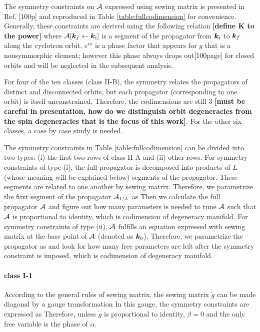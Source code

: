 \documentclass[aps, prb, showpacs, twocolumn, notitlepage, superscriptaddress]{revtex4-1}
\begin{document}
The symmetry constraints on ${\cal A}$ expressed using sewing matrix is presented in Ref. [100p] and reproduced in Table \ref{table:fullcodimension} for convenience. Generally, these constraints are derived using the following relation
\textbf{[define K to the power]} where ${\cal A}[\boldsymbol{k}_f\leftarrow \boldsymbol{k}_i]$ is a segment of the propagator from $\boldsymbol{k}_i$ to $\boldsymbol{k}_f$ along the cyclotron orbit. $e^{i\phi}$ is a phase factor that appears for $g$ that is a nonsymmorphic element; however this phase always drops out[100page] for closed orbits and will be neglected in the subsequent analysis.

For four of  the ten classes (class II-B), the symmetry relates the propagators of distinct and disconnected orbits, but each propagator (corresponding to one orbit) is itself unconstrained.  Therefore, the codimensions are still 3 \textbf{[must be careful in presentation, how do we distinguish orbit degeneracies from the spin degeneracies that is the focus of this work]}. For the other six classes, a case by case study is needed. 

The symmetry constraints in Table \ref{table:fullcodimension} can be divided into two types: (i) the first two rows of class II-A and (ii) other rows. For symmetry constraints of type (i), the full propagator is decomposed into products of $L$ (whose meaning will be explained below) segments of the propagator. These segments are related to one another by sewing matrix. Therefore, we parametrize the first segment of the propagator ${\cal A}_{1/L}$ as
Then we calculate the full propagator ${\cal A}$ and figure out how many parameters is needed to tune ${\cal A}$ such that ${\cal A}$ is proportional to identity, which is codimension of degeneracy manifold. For symmetry constraints of type (ii), ${\cal A}$ fulfills an equation expressed with sewing matrix at the base point of ${\cal A}$ (denoted as $\boldsymbol{k}_0$). Therefore, we parametrize the propagator as
and look for how many free parameters are left after the symmetry constraint is imposed, which is codimension of degeneracy manifold.


\paragraph*{class I-1} According to the general rules of sewing matrix, the sewing matrix $\breve{g}$ can be made diagonal by a gauge transformation
In this gauge, the symmetry constraints are expressed as 
Therefore, unless $\breve{g}$ is proportional to identity, $\beta=0$ and the only free variable is the phase of $\alpha$.
\end{document}
